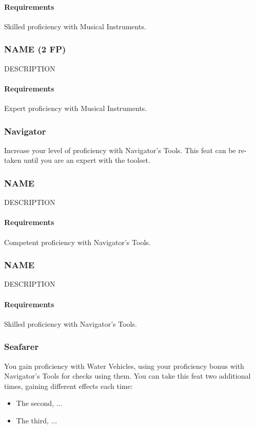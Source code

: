    \paragraph{Requirements} Skilled proficiency with Musical Instruments.
\subsubsection{NAME (2 FP)} \label{feat::name}
    DESCRIPTION
    \paragraph{Requirements} Expert proficiency with Musical Instruments.
\subsubsection{Navigator} \label{feat::navigator}
    Increase your level of proficiency with Navigator's Tools.
    This feat can be re-taken until you are an expert with the toolset.
\subsubsection{NAME} \label{feat::name}
    DESCRIPTION
    \paragraph{Requirements} Competent proficiency with Navigator's Tools.
\subsubsection{NAME} \label{feat::name}
    DESCRIPTION
    \paragraph{Requirements} Skilled proficiency with Navigator's Tools.
\subsubsection{Seafarer} \label{feat::seafarer}
    You gain proficiency with Water Vehicles, using your proficiency bonus with Navigator's Tools for checks using them.
    You can take this feat two additional times, gaining different effects each time:
    \begin{itemize}
        \item The second, ...
        \item The third, ... %
    \end{itemize}
